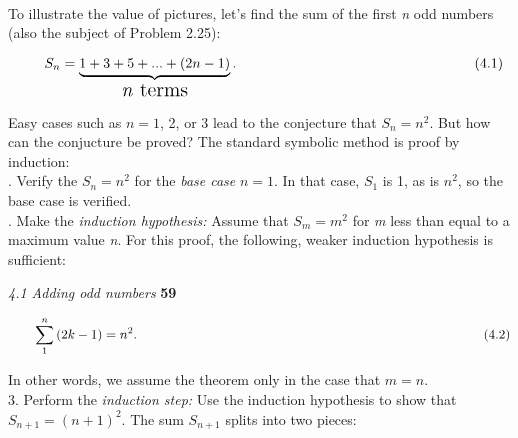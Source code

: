 \documentclass [a4paper]{article}
\begin{document}
\vspace*{2mm}
\vspace{0.2mm}\\
\begin{justify}
\Large To illustrate the value of pictures, let's find the sum of the first \textit{n} odd numbers (also the subject of Problem 2.25):
\end{justify}
\Large \[ \hspace*{2em} S_n = \underbrace{1 + 3 + 5 + . . . +
(2n - 1)}_\text{\Large\textit{n} terms}. \hspace{60mm} (4.1)\]
\begin{justify}
\Large Easy cases such as $n = 1$, 2, or 3 lead to the conjecture that $S_n = n^2$. But how can the conjucture be proved? The standard symbolic method is proof by induction:
\vspace*{2mm}\\
.
Verify the $S_n = n^2$ for the \textit{base case} $n = 1$. In that case, $S_1$ is 1, as is \hspace*{1em} $n^2$, so the base case is verified.
\vspace*{2mm}\\
. Make the \textit{induction hypothesis:} Assume that $S_m = m^2$ for \textit{m} less than \hspace*{0.9em} equal to a maximum value \textit{n}. For this proof, the following, weaker \hspace*{1.2em}induction hypothesis is sufficient:
\end{justify}
\newpage
\pagestyle{fancy}
\begin{justify}
\Large {\textit{\hspace*{-2em}4.1 \hspace*{1mm} Adding odd numbers} \hspace{10cm} \textbf{59}}
\end{justify}
\vspace*{3mm}
$$\hspace*{2em} \sum_{1}^{n}{(2k-1) = n^2.\hspace*{9.35cm} (4.2)}$$
\vspace*{3mm}
\begin{justify}
\Large In other words, we assume the theorem only in the case that $m=n$.\\
\hspace*{-1.5em}3. Perform the \textit{induction step:} Use the induction hypothesis to show that $S_{n+1} = (n + 1)^2$. The sum $S_{n+1}$ splits into two pieces:
\end{justify}
\end{document}
